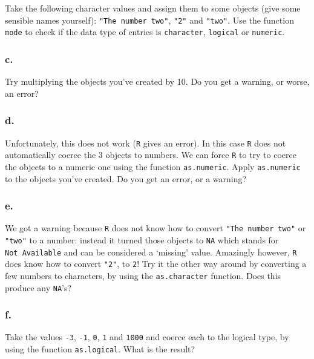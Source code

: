 \documentclass[]{article}
\begin{document}
Take the following character values and assign them to some objects
(give some sensible names yourself): \texttt{"The\ number\ two"},
\texttt{"2"} and \texttt{"two"}. Use the function \texttt{mode} to check
if the data type of entries is \texttt{character}, \texttt{logical} or
\texttt{numeric}.

\hypertarget{c.-1}{%
\subsubsection{c.}\label{c.-1}}

Try multiplying the objects you've created by 10. Do you get a warning,
or worse, an error?

\hypertarget{d.-1}{%
\subsubsection{d.}\label{d.-1}}

Unfortunately, this does not work (\texttt{R} gives an error). In this
case \texttt{R} does not automatically coerce the 3 objects to numbers.
We can force \texttt{R} to try to coerce the objects to a numeric one
using the function \texttt{as.numeric}. Apply \texttt{as.numeric} to the
objects you've created. Do you get an error, or a warning?

\hypertarget{e.-1}{%
\subsubsection{e.}\label{e.-1}}

We got a warning because \texttt{R} does not know how to convert
\texttt{"The\ number\ two"} or \texttt{"two"} to a number: instead it
turned those objects to \texttt{NA} which stands for
\texttt{Not\ Available} and can be considered a `missing' value.
Amazingly however, \texttt{R} does know how to convert \texttt{"2"}, to
\texttt{2}! Try it the other way around by converting a few numbers to
characters, by using the \texttt{as.character} function. Does this
produce any \texttt{NA}'s?

\hypertarget{f.}{%
\subsubsection{f.}\label{f.}}

Take the values \texttt{-3}, \texttt{-1}, \texttt{0}, \texttt{1} and
\texttt{1000} and coerce each to the logical type, by using the function
\texttt{as.logical}. What is the result?
\end{document}
